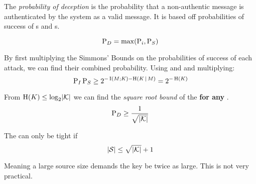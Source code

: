 \begin{definition}\label{def:Probability_of_Deception}
  The \emph{probability of deception} is the probability that a non-authentic message is authenticated by the  system as a valid message.
  It is based off probabilities of success of s and s.

  \begin{equation}\label{eq:Probability_of_Deception}
    \operatorname{\operatorname{P}}_{D} = \max(\operatorname{\operatorname{P}}_{i}, \operatorname{\operatorname{P}}_{S})
  \end{equation}
\end{definition}

\begin{theorem}\label{thm:Prob_Deception_Square_Root_Bound}
  By first multiplying the Simmons' Bounds on the probabilities of success of each attack, we can find their combined probability.
  Using  and  and multiplying:
  \begin{equation*}
    \operatorname{\operatorname{P}}_{I}\operatorname{\operatorname{P}}_{S} \geq 2^{-\operatorname{\operatorname{I}}(M; K) - \operatorname{\operatorname{H}}(K \operatorname{\vert} M)} = 2^{-\operatorname{\operatorname{H}}(K)}
  \end{equation*}

  From $\operatorname{\operatorname{H}}(K) \leq \log_{2} \lvert \operatorname{\mathcal{K}} \rvert$ we can find the \emph{square root bound} of the  \textbf{for any }.
  \begin{equation}\label{eq:Prob_Deception_Square_Root_Bound}
    \operatorname{\operatorname{P}}_{D} \geq \frac{1}{\sqrt{\lvert \operatorname{\mathcal{K}} \rvert}}
  \end{equation}
\end{theorem}

\begin{theorem}\label{thm:Prob_Deception_Square_Root_Bound_Tightness}
  The  can only be tight if
  \begin{equation}\label{eq:10}
    \lvert \operatorname{\mathcal{S}} \rvert \leq \sqrt{\lvert \operatorname{\mathcal{K}} \rvert} + 1
  \end{equation}

  Meaning a large source size demands the key be twice as large.
  This is not very practical.
\end{theorem}

